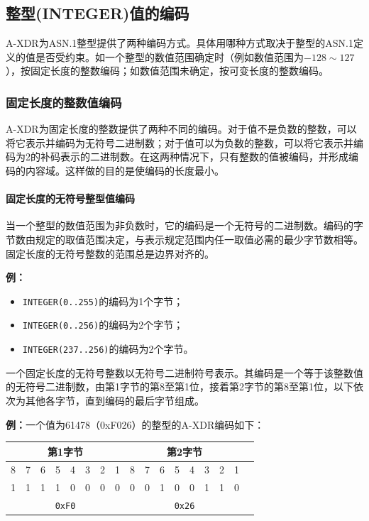 \documentclass[a4paper,11pt]{ctexart}
\begin{document}
\subsection{整型(INTEGER)值的编码}

A-XDR为ASN.1整型提供了两种编码方式。具体用哪种方式取决于整型的ASN.1定义的值是否受约束。如一个整型的数值范围确定时（例如数值范围为$-128 \sim 127$），按固定长度的整数编码；如数值范围未确定，按可变长度的整数编码。

\subsubsection{固定长度的整数值编码}

A-XDR为固定长度的整数提供了两种不同的编码。对于值不是负数的整数，可以将它表示并编码为无符号二进制数；对于值可以为负数的整数，可以将它表示并编码为2的补码表示的二进制数。在这两种情况下，只有整数的值被编码，并形成编码的内容域。这样做的目的是使编码的长度最小。

\paragraph{固定长度的无符号整型值编码}

当一个整型的数值范围为非负数时，它的编码是一个无符号的二进制数。编码的字节数由规定的取值范围决定，与表示规定范围内任一取值必需的最少字节数相等。固定长度的无符号整数的范围总是边界对齐的。

\noindent\textbf{例：}
\begin{itemize}[leftmargin=2em]
\item \texttt{INTEGER(0..255)}的编码为1个字节；
\item \texttt{INTEGER(0..256)}的编码为2个字节；
\item \texttt{INTEGER(237..256)}的编码为2个字节。
\end{itemize}

一个固定长度的无符号整数以无符号二进制符号表示。其编码是一个等于该整数值的无符号二进制数，由第1字节的第8至第1位，接着第2字节的第8至第1位，以下依次为其他各字节，直到编码的最后字节组成。

\noindent\textbf{例：}一个值为61478（0xF026）的整型的A-XDR编码如下：

\begin{center}
\begin{tabular}{|c|c|c|c|c|c|c|c||c|c|c|c|c|c|c|c|c|}
\hline
\multicolumn{8}{|c|}{第1字节} & \multicolumn{8}{|c|}{第2字节} \\
\hline
8 & 7 & 6 & 5 & 4 & 3 & 2 & 1 & 8 & 7 & 6 & 5 & 4 & 3 & 2 & 1 \\
\hline
1 & 1 & 1 & 1 & 0 & 0 & 0 & 0 & 0 & 0 & 1 & 0 & 0 & 1 & 1 & 0 \\
\hline
\multicolumn{8}{|c|}{\texttt{0xF0}} & \multicolumn{8}{|c|}{\texttt{0x26}} \\
\hline
\end{tabular}
\end{center}
\end{document}
